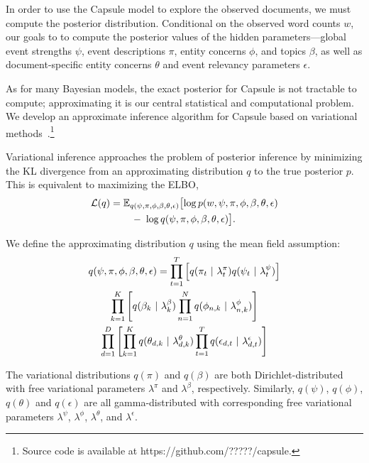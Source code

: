 In order to use the Capsule model to explore the observed documents, we must compute the posterior distribution.  Conditional on the observed word counts $w$, our goals to to compute the posterior values of the hidden parameters---global event strengths $\psi$, event descriptions $\pi$, entity concerns $\phi$, and topics $\beta$, as well as document-specific entity concerns $\theta$ and event relevancy parameters $\epsilon$.

As for many Bayesian models, the exact posterior for Capsule is not tractable to compute; approximating it is our central statistical and computational problem.  We develop an approximate inference algorithm for Capsule based on variational methods~\cite{Wainwright:2008}.\footnote{Source code is available at https://github.com/?????/capsule.}

Variational inference approaches the problem of posterior inference by minimizing the KL divergence from an approximating distribution $q$ to the true posterior $p$.
This is equivalent to maximizing the ELBO,
\begin{multline}
	\mathcal{L}(q)  = \mathbb{E}_{q(\psi, \pi, \phi, \beta, \theta, \epsilon)}\bigl[\log p(w, \psi, \pi, \phi, \beta, \theta, \epsilon) \\
	-~\log q(\psi, \pi, \phi, \beta, \theta, \epsilon)\bigr].
	\label{eq:elbo}
\end{multline}

We define the approximating distribution $q$ using the mean field assumption:
\begin{multline}
	q(\psi, \pi, \phi, \beta, \theta, \epsilon) = \prod_{t=1}^T \left[ q(\pi_{t} ~\vert~ \lambda^\pi_t) q(\psi_t ~\vert~ \lambda^\psi_t) \right] \\
		\prod_{k=1}^K \left[ q(\beta_{k} ~\vert~ \lambda^\beta_k) \prod_{n=1}^N q(\phi_{n,k} ~\vert~ \lambda^\phi_{n,k}) \right] \\
		\prod_{d=1}^D \left[
				\prod_{k=1}^K q(\theta_{d,k} ~\vert~ \lambda^\theta_{d,k})
				\prod_{t=1}^T q(\epsilon_{d,t} ~\vert~ \lambda^\epsilon_{d,t})
			\right]
	\label{eq:q}
\end{multline}

The variational distributions $q(\pi)$ and $q(\beta)$ are both Dirichlet-distributed with free variational parameters $\lambda^\pi$ and $\lambda^\beta$, respectively.  Similarly, $q(\psi)$, $q(\phi)$, $q(\theta)$ and $q(\epsilon)$ are all gamma-distributed with corresponding free variational parameters $\lambda^\psi$, $\lambda^\phi$, $\lambda^\theta$, and $\lambda^\epsilon$.

